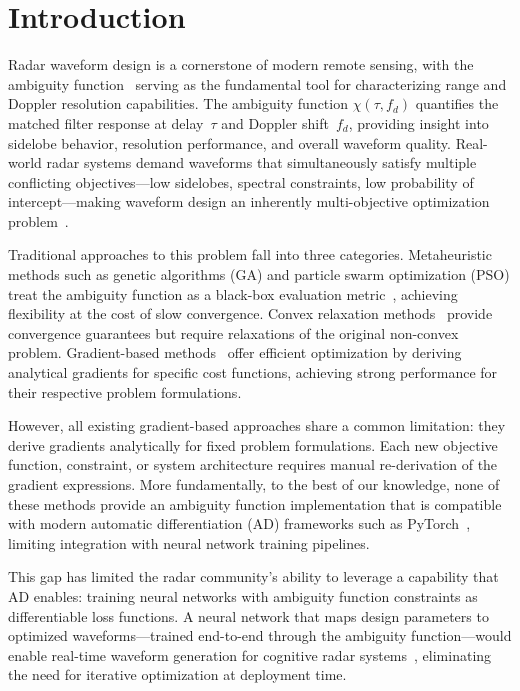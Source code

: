 \documentclass[journal]{IEEEtran}
\begin{document}
\section{Introduction}
\label{sec:intro}

Radar waveform design is a cornerstone of modern remote sensing, with the ambiguity function~\cite{woodward1953probability, levanon2004radar} serving as the fundamental tool for characterizing range and Doppler resolution capabilities.
The ambiguity function $\chi(\tau, f_d)$ quantifies the matched filter response at delay~$\tau$ and Doppler shift~$f_d$, providing insight into sidelobe behavior, resolution performance, and overall waveform quality.
Real-world radar systems demand waveforms that simultaneously satisfy multiple conflicting objectives---low sidelobes, spectral constraints, low probability of intercept---making waveform design an inherently multi-objective optimization problem~\cite{blunt2016overview}.

Traditional approaches to this problem fall into three categories.
Metaheuristic methods such as genetic algorithms (GA) and particle swarm optimization (PSO) treat the ambiguity function as a black-box evaluation metric~\cite{kim2025modified, maresca2024genetic, farnane2020optimization}, achieving flexibility at the cost of slow convergence.
Convex relaxation methods~\cite{niu2025novel} provide convergence guarantees but require relaxations of the original non-convex problem.
Gradient-based methods~\cite{alhujaili2020quartic, mohr2021gradient, baden2018multiobjective, aubry2013ambiguity, alaee2017coordinate, song2015optimization} offer efficient optimization by deriving analytical gradients for specific cost functions, achieving strong performance for their respective problem formulations.

However, all existing gradient-based approaches share a common limitation: they derive gradients analytically for fixed problem formulations.
Each new objective function, constraint, or system architecture requires manual re-derivation of the gradient expressions.
More fundamentally, to the best of our knowledge, none of these methods provide an ambiguity function implementation that is compatible with modern automatic differentiation (AD) frameworks such as PyTorch~\cite{paszke2019pytorch}, limiting integration with neural network training pipelines.

This gap has limited the radar community's ability to leverage a capability that AD enables: training neural networks with ambiguity function constraints as differentiable loss functions.
A neural network that maps design parameters to optimized waveforms---trained end-to-end through the ambiguity function---would enable real-time waveform generation for cognitive radar systems~\cite{haykin2006cognitive, gurbuz2019cognitive}, eliminating the need for iterative optimization at deployment time.
\end{document}
